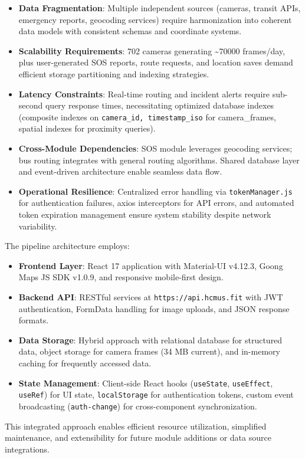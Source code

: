 \begin{itemize}
    \item \textbf{Data Fragmentation}: Multiple independent sources (cameras, transit APIs, emergency reports, geocoding services) require harmonization into coherent data models with consistent schemas and coordinate systems.
    \item \textbf{Scalability Requirements}: 702 cameras generating \textasciitilde70000 frames/day, plus user-generated SOS reports, route requests, and location saves demand efficient storage partitioning and indexing strategies.
    \item \textbf{Latency Constraints}: Real-time routing and incident alerts require sub-second query response times, necessitating optimized database indexes (composite indexes on \texttt{camera\_id, timestamp\_iso} for camera\_frames, spatial indexes for proximity queries).
    \item \textbf{Cross-Module Dependencies}: SOS module leverages geocoding services; bus routing integrates with general routing algorithms. Shared database layer and event-driven architecture enable seamless data flow.
    \item \textbf{Operational Resilience}: Centralized error handling via \texttt{tokenManager.js} for authentication failures, axios interceptors for API errors, and automated token expiration management ensure system stability despite network variability.
\end{itemize}

The pipeline architecture employs:
\begin{itemize}
    \item \textbf{Frontend Layer}: React 17 application with Material-UI v4.12.3, Goong Maps JS SDK v1.0.9, and responsive mobile-first design.
    \item \textbf{Backend API}: RESTful services at \texttt{https://api.hcmus.fit} with JWT authentication, FormData handling for image uploads, and JSON response formats.
    \item \textbf{Data Storage}: Hybrid approach with relational database for structured data, object storage for camera frames (34 MB current), and in-memory caching for frequently accessed data.
    \item \textbf{State Management}: Client-side React hooks (\texttt{useState}, \texttt{useEffect}, \texttt{useRef}) for UI state, \texttt{localStorage} for authentication tokens, custom event broadcasting (\texttt{auth-change}) for cross-component synchronization.
\end{itemize}

This integrated approach enables efficient resource utilization, simplified maintenance, and extensibility for future module additions or data source integrations.
